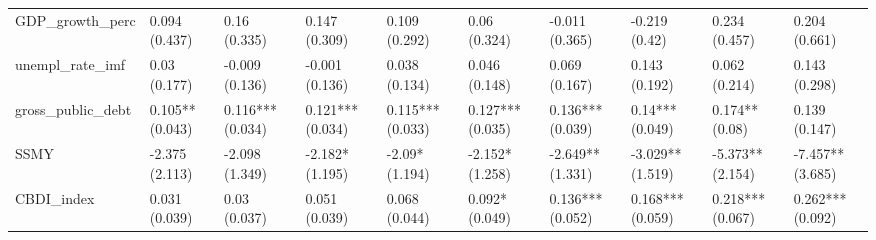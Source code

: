 \begin{table}[ht]
\begin{tabular}{llllllllll}
  GDP\_growth\_perc & 0.094 (0.437) & 0.16 (0.335) & 0.147 (0.309) & 0.109 (0.292) & 0.06 (0.324) & -0.011 (0.365) & -0.219 (0.42) & 0.234 (0.457) & 0.204 (0.661) \\ 
  unempl\_rate\_imf & 0.03 (0.177) & -0.009 (0.136) & -0.001 (0.136) & 0.038 (0.134) & 0.046 (0.148) & 0.069 (0.167) & 0.143 (0.192) & 0.062 (0.214) & 0.143 (0.298) \\ 
  gross\_public\_debt & 0.105** (0.043) & 0.116*** (0.034) & 0.121*** (0.034) & 0.115*** (0.033) & 0.127*** (0.035) & 0.136*** (0.039) & 0.14*** (0.049) & 0.174** (0.08) & 0.139 (0.147) \\ 
  SSMY & -2.375 (2.113) & -2.098 (1.349) & -2.182* (1.195) & -2.09* (1.194) & -2.152* (1.258) & -2.649** (1.331) & -3.029** (1.519) & -5.373** (2.154) & -7.457** (3.685) \\ 
  CBDI\_index & 0.031 (0.039) & 0.03 (0.037) & 0.051 (0.039) & 0.068 (0.044) & 0.092* (0.049) & 0.136*** (0.052) & 0.168*** (0.059) & 0.218*** (0.067) & 0.262*** (0.092) \\ 
   \bottomrule
\end{tabular}
\endgroup
\end{table}
